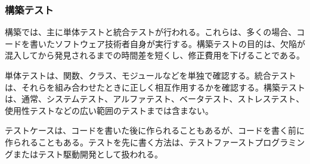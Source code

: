 \subsubsection{構築テスト}

構築では、主に単体テストと統合テストが行われる。これらは、多くの場合、コードを書いたソフトウェア技術者自身が実行する。構築テストの目的は、欠陥が混入してから発見されるまでの時間差を短くし、修正費用を下げることである。

単体テストは、関数、クラス、モジュールなどを単独で確認する。統合テストは、それらを組み合わせたときに正しく相互作用するかを確認する。構築テストは、通常、システムテスト、アルファテスト、ベータテスト、ストレステスト、使用性テストなどの広い範囲のテストまでは含まない。

テストケースは、コードを書いた後に作られることもあるが、コードを書く前に作られることもある。テストを先に書く方法は、テストファーストプログラミングまたはテスト駆動開発として扱われる。
